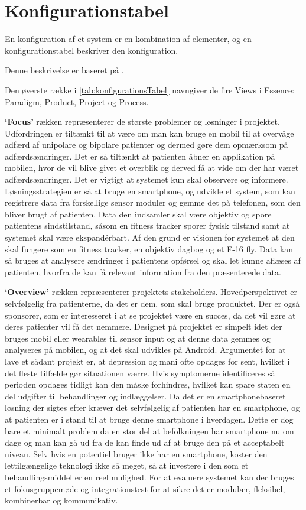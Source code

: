 \section{Konfigurationstabel}
En konfiguration af et system er en kombination af elementer, og en konfigurationstabel beskriver den konfiguration.

Denne beskrivelse er baseret på \citet[Afsnit 3.2, Side 16-21]{art:essence}.

Den øverste række i \cref{tab:konfigurationsTabel} navngiver de fire Views i Essence: Paradigm, Product, Project og Process.

\textbf{`Focus'} rækken repræsenterer de største problemer og løsninger i projektet. 
Udfordringen er tiltænkt til at være om man kan bruge en mobil til at overvåge adfærd af unipolare og bipolare patienter og dermed gøre dem opmærksom på adfærdsændringer.
Det er så tiltænkt at patienten åbner en applikation på mobilen, hvor de vil blive givet et overblik og derved få at vide om der har været adfærdsændringer. 
Det er vigtigt at systemet kun skal observere og informere.
Løsningsstrategien er så at bruge en smartphone, og udvikle et system, som kan registrere data fra forskellige sensor moduler og gemme det på telefonen, som den bliver brugt af patienten.
Data den indsamler skal være objektiv og spore patientens sindstilstand, såsom en fitness tracker sporer fysisk tilstand samt at systemet skal være ekspandérbart.
Af den grund er visionen for systemet at den skal fungere som en fitness tracker, en objektiv dagbog og et F-16 fly.
Data kan så bruges at analysere ændringer i patientens opførsel og skal let kunne aflæses af patienten, hvorfra de kan få relevant information fra den præsenterede data. 

\textbf{`Overview'} rækken repræsenterer projektets stakeholders. Hovedperspektivet er selvfølgelig fra patienterne, da det er dem, som skal bruge produktet.
Der er også sponsorer, som er interesseret i at se projektet være en succes, da det vil gøre at deres patienter vil få det nemmere. 
Designet på projektet er simpelt idet der bruges mobil eller wearables til sensor input og at denne data gemmes og analyseres på mobilen, og at det skal udvikles på Android.
Argumentet for at lave et sådant projekt er, at depression og mani ofte opdages for sent, hvilket i det fleste tilfælde gør situationen værre.
Hvis symptomerne identificeres så perioden opdages tidligt kan den måske forhindres, hvilket kan spare staten en del udgifter til behandlinger og indlæggelser.
Da det er en smartphonebaseret løsning der sigtes efter kræver det selvfølgelig af patienten har en smartphone, og at patienten er i stand til at bruge denne smartphone i hverdagen.
Dette er dog bare et minimalt problem da en stor del at befolkningen har smartphone nu om dage og man kan gå ud fra de kan finde ud af at bruge den på et acceptabelt niveau.
Selv hvis en potentiel bruger ikke har en smartphone, koster den lettilgængelige teknologi ikke så meget, så at investere i den som et behandlingsmiddel er en reel mulighed.
For at evaluere systemet kan der bruges et fokusgruppemøde og integrationstest for at sikre det er modulær, fleksibel, kombinerbar og kommunikativ.

